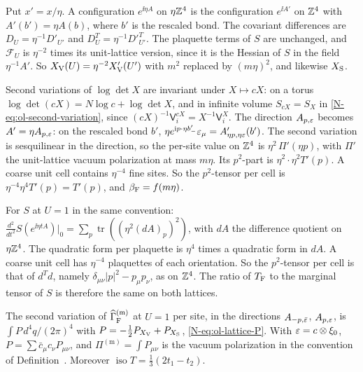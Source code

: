 \begin{step}[Rescaling]
Put $x'=x/\eta$. A configuration $e^{\ii\eta A}$ on $\eta\mathbb Z^4$ is the configuration $e^{\ii A'}$ on $\mathbb Z^4$ with $A'(b')=\eta A(b)$, where $b'$ is the rescaled bond. The covariant differences are $D_U=\eta^{-1}D'_{U'}$ and $D_U^T=\eta^{-1}D'^T_{U'}$. The plaquette terms of $S$ are unchanged, and $\mathcal F_U$ is $\eta^{-2}$ times its unit-lattice version, since it is the Hessian of $S$ in the field $\eta^{-1}A'$. So $X_{\rm V}(U)=\eta^{-2}X'_{\rm V}(U')$ with $m^2$ replaced by $(m\eta)^2$, and likewise $X_{\rm S}$.

Second variations of $\log\det X$ are invariant under $X\mapsto cX$: on a torus $\log\det(cX)=N\log c+\log\det X$, and in infinite volume $S_{cX}=S_X$ in \eqref{N-eq:ol-second-variation}, since $(cX)^{-1}\mathsf V_i^{cX}=X^{-1}\mathsf V_i^X$. The direction $A_{p,\varepsilon}$ becomes $A'=\eta A_{p,\varepsilon}$: on the rescaled bond $b'$, $\eta e^{\mathrm i p\cdot\eta b'_-}\varepsilon_\mu=A'_{\eta p,\eta\varepsilon}(b')$. The second variation is sesquilinear in the direction, so the per-site value on $\mathbb Z^4$ is $\eta^2\,\Pi'(\eta p)$, with $\Pi'$ the unit-lattice vacuum polarization at mass $m\eta$. Its $p^2$-part is $\eta^2\cdot\eta^2T'(p)$. A coarse unit cell contains $\eta^{-4}$ fine sites. So the $p^2$-tensor per cell is $\eta^{-4}\eta^4T'(p)=T'(p)$, and $\beta_{\rm F}=f(m\eta)$.
\end{step}

\begin{step}
For $S$ at $U=1$ in the same convention: $\frac{d^2}{dt^2}S(e^{\ii\eta tA})|_0=\sum_p\operatorname{tr}((\eta^2(dA)_p)^2)$, with $dA$ the difference quotient on $\eta\mathbb Z^4$. The quadratic form per plaquette is $\eta^4$ times a quadratic form in $dA$. A coarse unit cell has $\eta^{-4}$ plaquettes of each orientation. So the $p^2$-tensor per cell is that of $d^Td$, namely $\delta_{\mu\nu}|p|^2-p_\mu p_\nu$, as on $\mathbb Z^4$. The ratio of $T_{\rm F}$ to the marginal tensor of $S$ is therefore the same on both lattices.
\end{step}

\begin{detail}\label{d11b:ol-integral}
The second variation of $\widehat\Gamma^{(\mathrm m)}_{\rm F}$ at $U=1$ per site, in the directions $A_{-p,\bar{\varepsilon}}$, $A_{p,\varepsilon}$, is $\int P\,d^4q/(2\pi)^4$ with $P=-\frac12P_{X_{\rm V}}+P_{X_{\rm S}}$, \eqref{N-eq:ol-lattice-P}. With $\varepsilon=c\otimes\xi_0$, $P=\sum\bar c_\mu c_\nu P_{\mu\nu}$, and $\Pi^{(\mathrm m)}=\int P_{\mu\nu}$ is the vacuum polarization in the convention of Definition~. Moreover $\operatorname{iso}T=\frac13(2t_1-t_2)$.
\end{detail}

